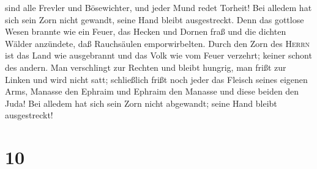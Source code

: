 sind alle Frevler und Bösewichter, und jeder Mund redet Torheit! Bei
alledem hat sich sein Zorn nicht gewandt, seine Hand bleibt
ausgestreckt.  Denn das gottlose Wesen brannte wie ein
Feuer, das Hecken und Dornen fraß und die dichten Wälder anzündete, daß
Rauchsäulen emporwirbelten.  Durch den Zorn des
\textsc{Herrn} ist das Land wie ausgebrannt und das Volk wie vom Feuer
verzehrt; keiner schont des andern.  Man verschlingt zur
Rechten und bleibt hungrig, man frißt zur Linken und wird nicht satt;
schließlich frißt noch jeder das Fleisch seines eigenen Arms,
 Manasse den Ephraim und Ephraim den Manasse und diese
beiden den Juda! Bei alledem hat sich sein Zorn nicht abgewandt; seine
Hand bleibt ausgestreckt!

\hypertarget{section-9}{%
\section{10}\label{section-9}}

